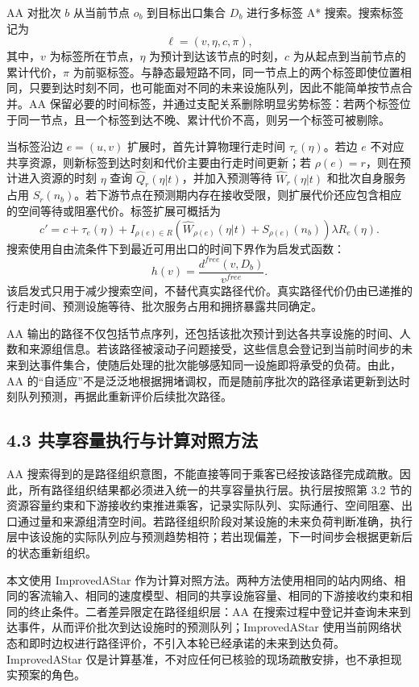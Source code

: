 \documentclass[UTF8,a4paper,12pt]{ctexart}
\begin{document}
AA 对批次 \(b\) 从当前节点 \(o_b\) 到目标出口集合 \(D_b\) 进行多标签 A* 搜索。搜索标签记为
\[
\ell=(v,\eta,c,\pi),
\]
其中，\(v\) 为标签所在节点，\(\eta\) 为预计到达该节点的时刻，\(c\) 为从起点到当前节点的累计代价，\(\pi\) 为前驱标签。与静态最短路不同，同一节点上的两个标签即使位置相同，只要到达时刻不同，也可能面对不同的未来设施队列，因此不能简单按节点合并。AA 保留必要的时间标签，并通过支配关系删除明显劣势标签：若两个标签位于同一节点，且一个标签到达不晚、累计代价不高，则另一个标签可被剔除。

当标签沿边 \(e=(u,v)\) 扩展时，首先计算物理行走时间 \(\tau_e(\eta)\)。若边 \(e\) 不对应共享资源，则新标签到达时刻和代价主要由行走时间更新；若 \(\rho(e)=r\)，则在预计进入资源的时刻 \(\eta\) 查询 \(\widehat Q_r(\eta|t)\)，并加入预测等待 \(\widehat W_r(\eta|t)\) 和批次自身服务占用 \(S_r(n_b)\)。若下游节点在预测期内存在接收受限，则扩展代价还应包含相应的空间等待或阻塞代价。标签扩展可概括为
\[
c'=
c+\tau_e(\eta)+I_{\rho(e)\in R}
\left(\widehat W_{\rho(e)}(\eta|t)+S_{\rho(e)}(n_b)\right)
\lambda R_e(\eta).
\]
搜索使用自由流条件下到最近可用出口的时间下界作为启发式函数：
\[
h(v)=\frac{d^{free}(v,D_b)}{v^{free}}.
\]
该启发式只用于减少搜索空间，不替代真实路径代价。真实路径代价仍由已递推的行走时间、预测设施等待、批次服务占用和拥挤暴露共同确定。

AA 输出的路径不仅包括节点序列，还包括该批次预计到达各共享设施的时间、人数和来源组信息。若该路径被滚动子问题接受，这些信息会登记到当前时间步的未来到达事件集合，使随后处理的批次能够感知同一设施即将承受的负荷。由此，AA 的“自适应”不是泛泛地根据拥堵调权，而是随前序批次的路径承诺更新到达时刻队列预测，再据此重新评价后续批次路径。

\subsection{4.3 共享容量执行与计算对照方法}

AA 搜索得到的是路径组织意图，不能直接等同于乘客已经按该路径完成疏散。因此，所有路径组织结果都必须进入统一的共享容量执行层。执行层按照第 3.2 节的资源容量约束和下游接收约束推进乘客，记录实际队列、实际通行、空间阻塞、出口通过量和来源组清空时间。若路径组织阶段对某设施的未来负荷判断准确，执行层中该设施的实际队列应与预测趋势相符；若出现偏差，下一时间步会根据更新后的状态重新组织。

本文使用 ImprovedAStar 作为计算对照方法。两种方法使用相同的站内网络、相同的客流输入、相同的速度模型、相同的共享设施容量、相同的下游接收约束和相同的终止条件。二者差异限定在路径组织层：AA 在搜索过程中登记并查询未来到达事件，从而评价批次到达设施时的预测队列；ImprovedAStar 使用当前网络状态和即时边权进行路径评价，不引入本轮已经承诺的未来到达负荷。ImprovedAStar 仅是计算基准，不对应任何已核验的现场疏散安排，也不承担现实预案的角色。
\end{document}
